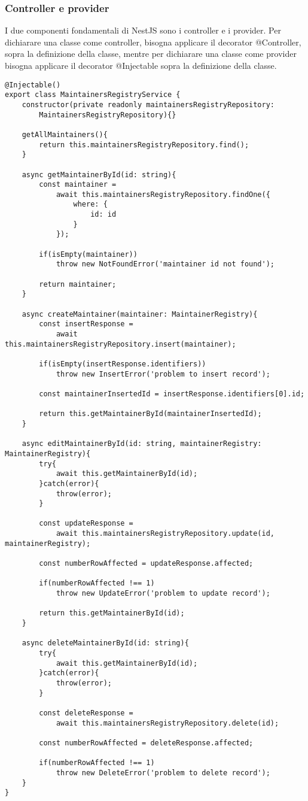 \subsubsection{Controller e provider}
I due componenti fondamentali di NestJS sono i controller e i provider. 
Per dichiarare una classe come controller, bisogna applicare il decorator @Controller, sopra la 
definizione della classe, mentre per dichiarare una classe come provider bisogna applicare il decorator
@Injectable sopra la definizione della classe.
\\
\begin{lstlisting}
@Injectable()
export class MaintainersRegistryService {
    constructor(private readonly maintainersRegistryRepository: 
        MaintainersRegistryRepository){}

    getAllMaintainers(){
        return this.maintainersRegistryRepository.find();
    }

    async getMaintainerById(id: string){
        const maintainer = 
            await this.maintainersRegistryRepository.findOne({
                where: {
                    id: id
                }
            });

        if(isEmpty(maintainer))
            throw new NotFoundError('maintainer id not found');

        return maintainer;
    }

    async createMaintainer(maintainer: MaintainerRegistry){
        const insertResponse = 
            await this.maintainersRegistryRepository.insert(maintainer);

        if(isEmpty(insertResponse.identifiers))
            throw new InsertError('problem to insert record');

        const maintainerInsertedId = insertResponse.identifiers[0].id;

        return this.getMaintainerById(maintainerInsertedId);
    }

    async editMaintainerById(id: string, maintainerRegistry: MaintainerRegistry){
        try{
            await this.getMaintainerById(id);    
        }catch(error){
            throw(error);
        }
        
        const updateResponse = 
            await this.maintainersRegistryRepository.update(id, maintainerRegistry);

        const numberRowAffected = updateResponse.affected;

        if(numberRowAffected !== 1)
            throw new UpdateError('problem to update record');

        return this.getMaintainerById(id);
    }

    async deleteMaintainerById(id: string){
        try{
            await this.getMaintainerById(id);    
        }catch(error){
            throw(error);
        }

        const deleteResponse = 
            await this.maintainersRegistryRepository.delete(id);

        const numberRowAffected = deleteResponse.affected;

        if(numberRowAffected !== 1)
            throw new DeleteError('problem to delete record');
    }
}
\end{lstlisting}
